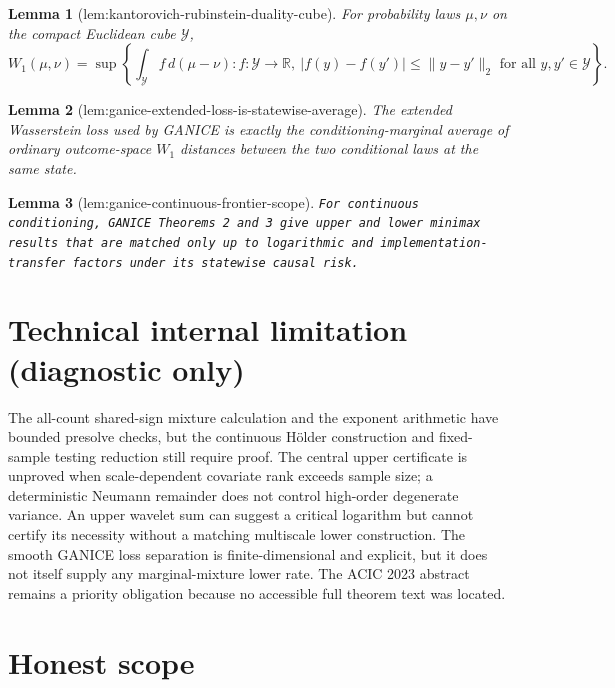 \documentclass{article}
\newtheorem{lemma}{Lemma}
\begin{document}
\begin{lemma}[lem:kantorovich-rubinstein-duality-cube]\label{lem:kantorovich-rubinstein-duality-cube}
For probability laws \(\mu,\nu\) on the compact Euclidean cube \(\mathcal Y\), \[W_1(\mu,\nu)=\sup\left\{\int_{\mathcal Y}f\,d(\mu-\nu):f:\mathcal Y\to\mathbb R,\ |f(y)-f(y')|\le\lVert y-y'\rVert_2\text{ for all }y,y'\in\mathcal Y\right\}.\]
\end{lemma}

\begin{lemma}[lem:ganice-extended-loss-is-statewise-average]\label{lem:ganice-extended-loss-is-statewise-average}
The extended Wasserstein loss used by GANICE is exactly the conditioning-marginal average of ordinary outcome-space \(W_1\) distances between the two conditional laws at the same state.
\end{lemma}

\begin{lemma}[lem:ganice-continuous-frontier-scope]\label{lem:ganice-continuous-frontier-scope}
\texttt{For continuous conditioning,\allowbreak{} GANICE Theorems 2 and 3 give upper and lower minimax results that are matched only up to logarithmic and implementation-\allowbreak{}transfer factors under its statewise causal risk.}
\end{lemma}

\section*{Technical internal limitation (diagnostic only)}

The all-count shared-sign mixture calculation and the exponent arithmetic have bounded presolve checks, but the continuous Hölder construction and fixed-sample testing reduction still require proof. The central upper certificate is unproved when scale-dependent covariate rank exceeds sample size; a deterministic Neumann remainder does not control high-order degenerate variance. An upper wavelet sum can suggest a critical logarithm but cannot certify its necessity without a matching multiscale lower construction. The smooth GANICE loss separation is finite-dimensional and explicit, but it does not itself supply any marginal-mixture lower rate. The ACIC 2023 abstract remains a priority obligation because no accessible full theorem text was located.

\section{Honest scope}
\end{document}
